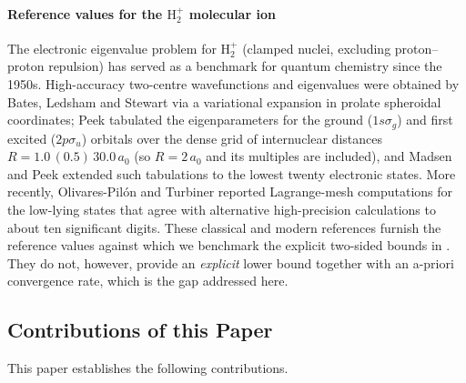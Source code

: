 \documentclass[11pt]{article}
\theoremstyle{plain}
\theoremstyle{definition}
\theoremstyle{remark}
\begin{document}
\paragraph{Reference values for the
\texorpdfstring{$\mathrm{H}_2^+$}{H2+} molecular ion}
The electronic eigenvalue problem for $\mathrm{H}_2^+$ (clamped
nuclei, excluding proton--proton repulsion) has served as a
benchmark for quantum chemistry since the 1950s.
High-accuracy two-centre wavefunctions and eigenvalues were
obtained by Bates, Ledsham and Stewart \cite{Bates1953} via a
variational expansion in prolate spheroidal coordinates; Peek
\cite{Peek1965} tabulated the eigenparameters for the ground
($1s\sigma_g$) and first excited ($2p\sigma_u$) orbitals over
the dense grid of internuclear distances
$R = 1.0\,(0.5)\,30.0\,a_0$ (so $R=2\,a_0$ and its multiples
are included), and Madsen and Peek \cite{MadsenPeek1971}
extended such tabulations to the lowest twenty electronic
states.  More recently, Olivares-Pil\'on and Turbiner
\cite{OlivaresTurbiner2016} reported Lagrange-mesh computations
for the low-lying states that agree with alternative
high-precision calculations to about ten significant digits.
These classical and modern references furnish the reference
values against which we benchmark the explicit two-sided bounds
in . They do not, however, provide an
\emph{explicit} lower bound together with an a-priori convergence
rate, which is the gap addressed here.

\subsection*{Contributions of this Paper}

This paper establishes the following contributions.
\end{document}
